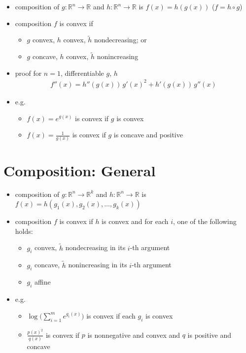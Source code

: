 \documentclass[11pt]{extarticle}
\newcommand{\ds}{\displaystyle}
\theoremstyle{definition}
\begin{document}
\begin{itemize}
  \item composition of $g:\mathbb{R}^n\to\mathbb{R}$ and $h:\mathbb{R}^n\to\mathbb{R}$ is $\ds f(x) = h(g(x))$ ($\ds f = h\circ g$)
  \item composition $f$ is convex if
    \begin{itemize}
      \item $g$ convex, $h$ convex, $\ds\widetilde{h}$ nondecreasing; or
      \item $g$ concave, $h$ convex, $\ds\widetilde{h}$ nonincreasing
    \end{itemize}
  \item proof for $n = 1$, differentiable $g$, $h$
    \begin{align*}
      f''(x) = h''(g(x))\,g'(x)^2 + h'(g(x))\,g''(x)
    \end{align*}
  \item e.g.
    \begin{itemize}
      \item $f(x) = e^{g(x)}$ is convex if $g$ is convex
      \item $\ds f(x) = \frac{1}{g(x)}$ is convex if $g$ is concave and positive
    \end{itemize}
\end{itemize}

\newpage

\section*{Composition: General}

\begin{itemize}
  \item composition of $g:\mathbb{R}^n\to\mathbb{R}^k$ and $h:\mathbb{R}^n\to\mathbb{R}$ is $\ds f(x) = h(g_1(x), g_2(x),\ldots, g_k(x))$
  \item composition $f$ is convex if $h$ is convex and for each $i$, one of the following holds:
    \begin{itemize}
      \item $g_i$ convex, $\ds\widetilde{h}$ nondecreasing in its $i$-th argument
      \item $g_i$ concave, $\ds\widetilde{h}$ nonincreasing in its $i$-th argument
      \item $g_i$ affine
    \end{itemize}
  \item e.g.
    \begin{itemize}
      \item $\ds\log\Big(\sum_{i = 1}^m e^{g_i(x)}\Big)$ is convex if each $g_i$ is convex
      \item $\ds\frac{p(x)^2}{q(x)}$ is convex if $p$ is nonnegative and convex and $q$ is positive and concave
    \end{itemize}
\end{itemize}
\end{document}
